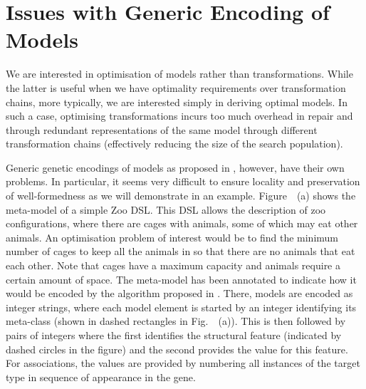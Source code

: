 \section{Issues with Generic Encoding of Models}
\label{section:issues}


  We are interested in optimisation of models rather than transformations. While the latter is useful when we have optimality requirements over transformation
	chains, more typically, we are interested simply in deriving optimal models. In such a case, optimising transformations incurs too much overhead in repair and
	through redundant representations of the same model through different transformation chains (effectively reducing the size of the search population).
	
	Generic genetic encodings of models as proposed in \cite{Kessentini+13,Williams13,Efstathiou+14b}, however, have their own problems. In particular, it seems very difficult to ensure locality and
	preservation of well-formedness as we will demonstrate in an example. Figure~~(a) shows the meta-model of a simple Zoo DSL. This DSL allows the description of zoo configurations,
	where there are cages with animals, some of which may eat other animals. An optimisation problem of interest would be to find the minimum number of cages to keep all the animals in so that there are
	no animals that eat each other. Note that cages have a maximum capacity and animals require a certain amount of space. The meta-model has been annotated to indicate how it would be encoded by the
	algorithm proposed in \cite{Williams13}. There, models are encoded as integer strings, where each model element is started by an integer identifying its meta-class (shown in dashed rectangles in 
	Fig.~~(a)). This is then followed by pairs of integers where the first identifies the structural feature (indicated by dashed circles in the figure) and the second provides the
	value for this feature. For associations, the values are provided by numbering all instances of the target type in sequence of appearance in the gene.
	
